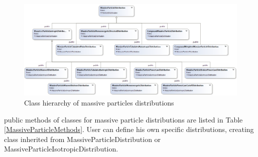 \begin{figure}[h]
	\centering
	\includegraphics[width=14.5 cm]{./fig/massiveParticleDistribution2.png} 
	\caption{Class hierarchy of massive particles distributions}
	\label{massiveDistribution}
\end{figure}

public methods of classes for massive particle distributions are listed in Table \ref{MassiveParticleMethods}. User can define his own specific distributions, creating class inherited from MassiveParticleDistribution or MassiveParticleIsotropicDistribution.

